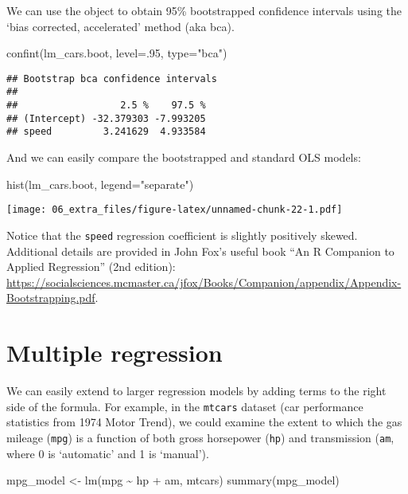 \documentclass[
]{book}
\newenvironment{Shaded}{\begin{snugshade}}{\end{snugshade}}
\newcommand{\AttributeTok}[1]{\textcolor[rgb]{0.77,0.63,0.00}{#1}}
\newcommand{\DecValTok}[1]{\textcolor[rgb]{0.00,0.00,0.81}{#1}}
\newcommand{\FunctionTok}[1]{\textcolor[rgb]{0.00,0.00,0.00}{#1}}
\newcommand{\NormalTok}[1]{#1}
\newcommand{\OtherTok}[1]{\textcolor[rgb]{0.56,0.35,0.01}{#1}}
\newcommand{\SpecialCharTok}[1]{\textcolor[rgb]{0.00,0.00,0.00}{#1}}
\newcommand{\StringTok}[1]{\textcolor[rgb]{0.31,0.60,0.02}{#1}}
\begin{document}
We can use the object to obtain 95\% bootstrapped confidence intervals using the `bias corrected, accelerated' method (aka bca).

\begin{Shaded}
\begin{Highlighting}[]
\FunctionTok{confint}\NormalTok{(lm\_cars.boot, }\AttributeTok{level=}\NormalTok{.}\DecValTok{95}\NormalTok{, }\AttributeTok{type=}\StringTok{"bca"}\NormalTok{)}
\end{Highlighting}
\end{Shaded}

\begin{verbatim}
## Bootstrap bca confidence intervals
## 
##                  2.5 %    97.5 %
## (Intercept) -32.379303 -7.993205
## speed         3.241629  4.933584
\end{verbatim}

And we can easily compare the bootstrapped and standard OLS models:

\begin{Shaded}
\begin{Highlighting}[]
\FunctionTok{hist}\NormalTok{(lm\_cars.boot, }\AttributeTok{legend=}\StringTok{"separate"}\NormalTok{)}
\end{Highlighting}
\end{Shaded}

\texttt{[image: 06\_extra\_files/figure-latex/unnamed-chunk-22-1.pdf]}

Notice that the \texttt{speed} regression coefficient is slightly positively skewed. Additional details are provided in John Fox's useful book ``An R Companion to Applied Regression'' (2nd edition): \url{https://socialsciences.mcmaster.ca/jfox/Books/Companion/appendix/Appendix-Bootstrapping.pdf}.

\hypertarget{multiple-regression}{%
\chapter{Multiple regression}\label{multiple-regression}}

We can easily extend to larger regression models by adding terms to the right side of the formula. For example, in the \texttt{mtcars} dataset (car performance statistics from 1974 Motor Trend), we could examine the extent to which the gas mileage (\texttt{mpg}) is a function of both gross horsepower (\texttt{hp}) and transmission (\texttt{am}, where 0 is `automatic' and 1 is `manual').

\begin{Shaded}
\begin{Highlighting}[]
\NormalTok{mpg\_model }\OtherTok{\textless{}{-}} \FunctionTok{lm}\NormalTok{(mpg }\SpecialCharTok{\textasciitilde{}}\NormalTok{ hp }\SpecialCharTok{+}\NormalTok{ am, mtcars)}
\FunctionTok{summary}\NormalTok{(mpg\_model)}
\end{Highlighting}
\end{Shaded}
\end{document}
